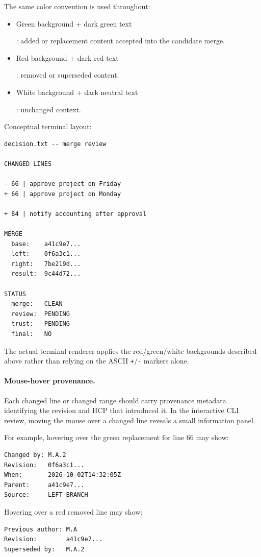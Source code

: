 \documentclass[11pt]{article}
\newcommand{\diffadd}[1]{%
  \begingroup
  \setlength{\fboxsep}{2pt}%
  \colorbox{diffgreen}{\textcolor{diffgreentext}{\strut #1}}%
  \endgroup
}
\newcommand{\diffremove}[1]{%
  \begingroup
  \setlength{\fboxsep}{2pt}%
  \colorbox{diffred}{\textcolor{diffredtext}{\strut #1}}%
  \endgroup
}
\newcommand{\diffsame}[1]{%
  \begingroup
  \setlength{\fboxsep}{2pt}%
  \colorbox{diffwhite}{\textcolor{diffunchangedtext}{\strut #1}}%
  \endgroup
}
\begin{document}
The same color convention is used throughout:

\begin{itemize}[leftmargin=1.5em]
  \item \diffadd{Green background + dark green text}: added or replacement content accepted into the candidate merge.
  \item \diffremove{Red background + dark red text}: removed or superseded content.
  \item \diffsame{White background + dark neutral text}: unchanged context.
\end{itemize}

Conceptual terminal layout:

\begin{lstlisting}
decision.txt -- merge review

CHANGED LINES

- 66 | approve project on Friday
+ 66 | approve project on Monday

+ 84 | notify accounting after approval

MERGE
  base:    a41c9e7...
  left:    0f6a3c1...
  right:   7be219d...
  result:  9c44d72...

STATUS
  merge:   CLEAN
  review:  PENDING
  trust:   PENDING
  final:   NO
\end{lstlisting}

The actual terminal renderer applies the red/green/white backgrounds described above rather than relying on the ASCII \texttt{+}/\texttt{-} markers alone.

\paragraph{Mouse-hover provenance.}

Each changed line or changed range should carry provenance metadata identifying the revision and HCP that introduced it. In the interactive CLI review, moving the mouse over a changed line reveals a small information panel.

For example, hovering over the green replacement for line 66 may show:

\begin{lstlisting}
Changed by: M.A.2
Revision:   0f6a3c1...
When:       2026-10-02T14:32:05Z
Parent:     a41c9e7...
Source:     LEFT BRANCH
\end{lstlisting}

Hovering over a red removed line may show:

\begin{lstlisting}
Previous author: M.A
Revision:        a41c9e7...
Superseded by:   M.A.2
\end{lstlisting}
\end{document}
